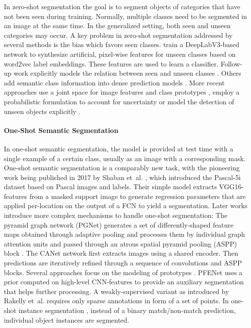 \documentclass[10pt,twocolumn,letterpaper]{article}
\begin{document}
In zero-shot segmentation the goal is to segment objects of categories that have not been seen during training. Normally, multiple classes need to be segmented in an image at the same time. In the generalized setting, both seen and unseen categories may occur. 
A key problem in zero-shot segmentation addressed by several methods is the bias which favors seen classes.
\citet{bucher19} train a DeepLabV3-based network to synthesize artificial, pixel-wise features for unseen classes based on word2vec label embeddings. These features are used to learn a classifier. 
Follow-up work explicitly models the relation between seen and unseen classes  \cite{li20}.
Others add semantic class information into dense prediction models \cite{xian19}.
More recent approaches use a joint space for image features and class prototypes \cite{baek21}, employ a probabilistic formulation to account for uncertainty \cite{hu20} or model the detection of unseen objects explicitly \cite{zhang21}.




















\paragraph{One-Shot Semantic Segmentation}
In one-shot semantic segmentation, the model is provided at test time with a single example of a certain class, usually as an image with a corresponding mask. 
One-shot semantic segmentation is a comparably new task, with the pioneering work being published in 2017 by Shaban et~al. \cite{shaban17}, which introduced the Pascal-5i dataset based on Pascal images and labels.
Their simple model extracts VGG16-features \cite{simonyan14} from a masked support image to generate regression parameters that are applied per-location on the output of a FCN \cite{long15} to yield a segmentation. 
Later works introduce more complex mechanisms to handle one-shot segmentation:
The pyramid graph network (PGNet) \cite{zhang19d} generates a set of differently-shaped feature maps obtained through adaptive pooling and processes them by individual graph attention units and passed through an atrous spatial pyramid pooling (ASPP) block \cite{chen18a}.
The CANet network \cite{zhang19a} first extracts images using a shared encoder. Then predictions are iteratively refined through a sequence of convolutions and ASPP blocks.
Several approaches focus on the modeling of prototypes \cite{wang19a, yang20, liu20}.
PFENet \cite{tian20a} uses a prior computed on high-level CNN-features to provide an auxiliary segmentation that helps further processing.
A weakly-supervised variant as introduced by Rakelly et~al. \cite{rakelly18fewshot} requires only sparse annotations in form of a set of points.
In one-shot instance segmentation \cite{michaelis18}, instead of a binary match/non-match prediction, individual object instances are segmented.
\end{document}
